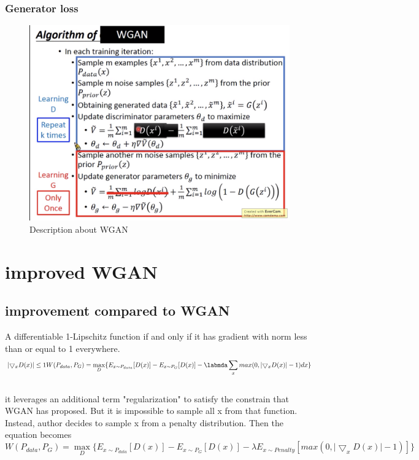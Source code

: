 \documentclass{article}
\begin{document}
\subsubsection{Generator loss}
\begin{figure}[H]
    \centering
    \includegraphics[width=\linewidth]{WGAN_algorithm}
    \caption{Description about WGAN}
\end{figure}
\section{improved WGAN}
\subsection{improvement compared to WGAN}
A differentiable 1-Lipschitz function if and only if it has gradient with norm less than or equal to 1 everywhere.
\begin{equation}
    \lvert \bigtriangledown_{x}D(x) \rvert \leq 1

    W(P_{data},P_G)=\max_{D} \{E_{x \sim P_{data}}[D(x)]-E_{x \sim P_{G}}[D(x)]-\labmda \sum_{x}max(0,\lvert \bigtriangledown_{x}D(x) \rvert -1)dx\}
\end{equation}\\

it leverages an additional term "regularization" to satisfy the constrain that WGAN has proposed. But it is impossible to sample all x from that function. Instead, author decides to sample x from a penalty distribution. Then the equation becomes
\begin{equation}

    W(P_{data},P_G)=\max_{D} \{E_{x \sim P_{data}}[D(x)]-E_{x \sim P_{G}}[D(x)]-\lambda E_{x \sim Penalty}[max(0,\lvert \bigtriangledown_{x}D(x) \rvert -1)]\}
\end{equation}
\end{document}

